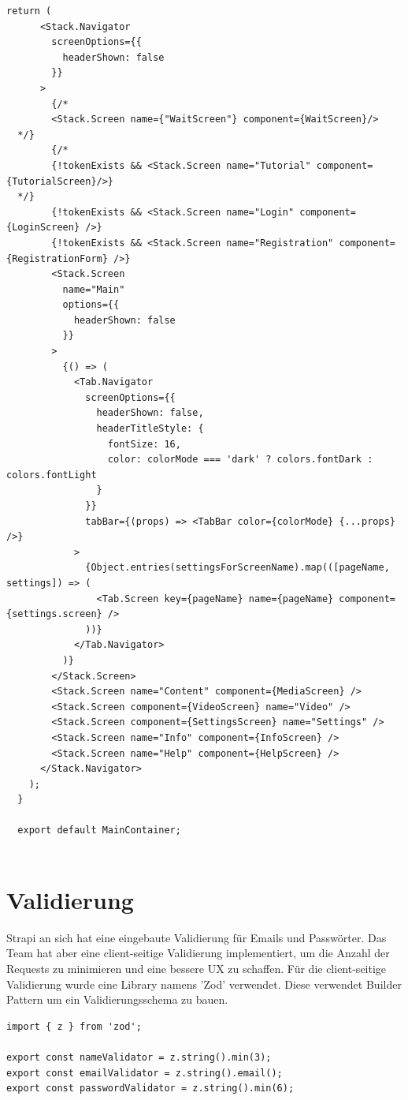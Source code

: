 \begin{lstlisting}[caption=protected screens]
    return (
      <Stack.Navigator
        screenOptions={{
          headerShown: false
        }}
      >
        {/*
        <Stack.Screen name={"WaitScreen"} component={WaitScreen}/>
  */}
        {/*
        {!tokenExists && <Stack.Screen name="Tutorial" component={TutorialScreen}/>}
  */}
        {!tokenExists && <Stack.Screen name="Login" component={LoginScreen} />}
        {!tokenExists && <Stack.Screen name="Registration" component={RegistrationForm} />}
        <Stack.Screen
          name="Main"
          options={{
            headerShown: false
          }}
        >
          {() => (
            <Tab.Navigator
              screenOptions={{
                headerShown: false,
                headerTitleStyle: {
                  fontSize: 16,
                  color: colorMode === 'dark' ? colors.fontDark : colors.fontLight
                }
              }}
              tabBar={(props) => <TabBar color={colorMode} {...props} />}
            >
              {Object.entries(settingsForScreenName).map(([pageName, settings]) => (
                <Tab.Screen key={pageName} name={pageName} component={settings.screen} />
              ))}
            </Tab.Navigator>
          )}
        </Stack.Screen>
        <Stack.Screen name="Content" component={MediaScreen} />
        <Stack.Screen component={VideoScreen} name="Video" />
        <Stack.Screen component={SettingsScreen} name="Settings" />
        <Stack.Screen name="Info" component={InfoScreen} />
        <Stack.Screen name="Help" component={HelpScreen} />
      </Stack.Navigator>
    );
  }
  
  export default MainContainer;
    
\end{lstlisting}

\section{Validierung}
Strapi an sich hat eine eingebaute Validierung für Emails und Passwörter. Das Team hat aber eine client-seitige Validierung implementiert, um die Anzahl der Requests zu minimieren und eine bessere UX zu schaffen.
Für die client-seitige Validierung wurde eine Library namens 'Zod' verwendet. Diese verwendet Builder Pattern um ein Validierungsschema zu bauen.
\begin{lstlisting}[caption=Validierungsschemen]
 import { z } from 'zod';

export const nameValidator = z.string().min(3);
export const emailValidator = z.string().email();
export const passwordValidator = z.string().min(6);
  
\end{lstlisting}


